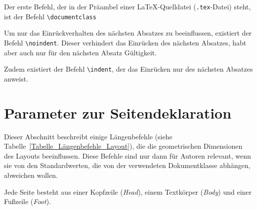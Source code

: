 Der erste Befehl, der in der Präambel einer \LaTeX-Quelldatei (\verb!.tex!-Datei) steht, ist der Befehl \verb!\documentclass!
\begin{document}
Um nur das Einrückverhalten des nächsten Absatzes zu beeinflussen, existiert der Befehl \verb!\noindent!. Dieser verhindert das Einrücken des nächsten Absatzes, habt aber auch nur für den nächsten Absatz Gültigkeit.


Zudem existiert 
der Befehl \verb!\indent!, der das 
Einrücken nur des nächsten Absatzes anweist.


\setlength{\parindent}{0em}

\section{Parameter zur Seitendeklaration}

Dieser Abschnitt beschreibt einige Längenbefehle (siehe Tabelle~\ref{Tabelle_Längenbefehle_Layout}), die die geometrischen Dimensionen des Layouts beeinflussen.
Diese Befehle sind nur dann für Autoren relevant, wenn sie von den 
Standardwerten, die von der verwendeten
Dokumentklasse abhängen, abweichen wollen. 

Jede Seite besteht aus einer Kopfzeile (\textsl{Head}), einem Textkörper
(\textsl{Body}) und einer Fußzeile (\textsl{Foot}).
\end{document}

